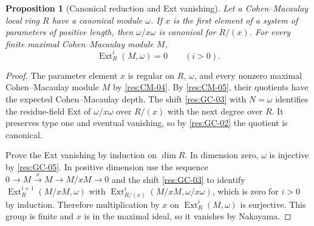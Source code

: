 \documentclass[11pt,oneside,openany]{book}
\newtheorem{proposition}[theorem]{Proposition}
\theoremstyle{definition}
\theoremstyle{remark}
\begin{document}
\begin{proposition}[Canonical reduction and Ext vanishing]
\label{res:GC-11}
Let a Cohen--Macaulay local ring $R$ have a canonical module
$\omega$. If $x$ is the first element of a system of parameters
of positive length, then $\omega/x\omega$ is canonical for
$R/(x)$. For every finite maximal Cohen--Macaulay module $M$,
\[
  \operatorname{Ext}^{i}_R(M,\omega)=0 \qquad (i>0).
\]
\end{proposition}
\begin{proof}
The parameter element $x$ is regular on $R$, $\omega$, and
every nonzero maximal Cohen--Macaulay module $M$ by
\ref{res:CM-04}. By \ref{res:CM-05}, their quotients have
the expected Cohen--Macaulay depth. The shift
\ref{res:GC-03} with $N=\omega$ identifies the residue-field
Ext of $\omega/x\omega$ over $R/(x)$ with the next degree
over $R$. It preserves type one and eventual vanishing,
so by \ref{res:GC-02} the quotient is canonical.

Prove the Ext vanishing by induction on $\dim R$.
In dimension zero, $\omega$ is injective by \ref{res:GC-05}.
In positive dimension use the sequence
$0\to M\xrightarrow{x}M\to M/xM\to0$ and the shift
\ref{res:GC-03} to identify
$\operatorname{Ext}^{i+1}_R(M/xM,\omega)$ with
$\operatorname{Ext}^i_{R/(x)}(M/xM,\omega/x\omega)$, which
is zero for $i>0$ by induction. Therefore multiplication
by $x$ on $\operatorname{Ext}^i_R(M,\omega)$ is surjective.
This group is finite and $x$ is in the maximal ideal,
so it vanishes by Nakayama.
\end{proof}
\end{document}
